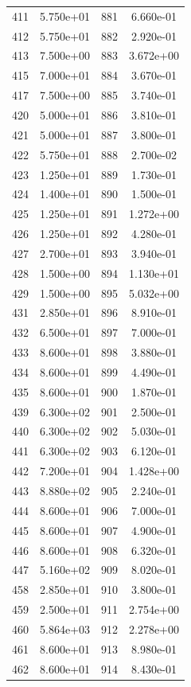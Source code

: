 \documentclass[12pt]{article}
\begin{document}
\begin{longtable}{@{}cccc@{}}
411 & 5.750e+01 & 881 & 6.660e-01 \\
412 & 5.750e+01 & 882 & 2.920e-01 \\
413 & 7.500e+00 & 883 & 3.672e+00 \\
415 & 7.000e+01 & 884 & 3.670e-01 \\
417 & 7.500e+00 & 885 & 3.740e-01 \\
420 & 5.000e+01 & 886 & 3.810e-01 \\
421 & 5.000e+01 & 887 & 3.800e-01 \\
422 & 5.750e+01 & 888 & 2.700e-02 \\
423 & 1.250e+01 & 889 & 1.730e-01 \\
424 & 1.400e+01 & 890 & 1.500e-01 \\
425 & 1.250e+01 & 891 & 1.272e+00 \\
426 & 1.250e+01 & 892 & 4.280e-01 \\
427 & 2.700e+01 & 893 & 3.940e-01 \\
428 & 1.500e+00 & 894 & 1.130e+01 \\
429 & 1.500e+00 & 895 & 5.032e+00 \\
431 & 2.850e+01 & 896 & 8.910e-01 \\
432 & 6.500e+01 & 897 & 7.000e-01 \\
433 & 8.600e+01 & 898 & 3.880e-01 \\
434 & 8.600e+01 & 899 & 4.490e-01 \\
435 & 8.600e+01 & 900 & 1.870e-01 \\
439 & 6.300e+02 & 901 & 2.500e-01 \\
440 & 6.300e+02 & 902 & 5.030e-01 \\
441 & 6.300e+02 & 903 & 6.120e-01 \\
442 & 7.200e+01 & 904 & 1.428e+00 \\
443 & 8.880e+02 & 905 & 2.240e-01 \\
444 & 8.600e+01 & 906 & 7.000e-01 \\
445 & 8.600e+01 & 907 & 4.900e-01 \\
446 & 8.600e+01 & 908 & 6.320e-01 \\
447 & 5.160e+02 & 909 & 8.020e-01 \\
458 & 2.850e+01 & 910 & 3.800e-01 \\
459 & 2.500e+01 & 911 & 2.754e+00 \\
460 & 5.864e+03 & 912 & 2.278e+00 \\
461 & 8.600e+01 & 913 & 8.980e-01 \\
462 & 8.600e+01 & 914 & 8.430e-01 \\

\end{longtable}
\end{document}
